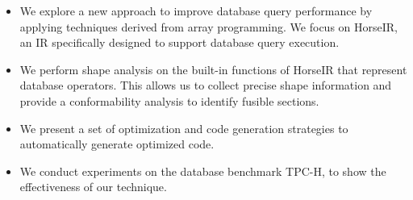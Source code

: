 \begin{itemize}
\item We explore a new approach to improve database query performance by
      applying techniques derived from array programming. We focus on HorseIR, an IR specifically designed to support database query execution.
\item We perform shape analysis on the built-in functions of HorseIR that represent database operators. This allows us to collect precise shape information and provide a conformability analysis to identify fusible sections. 
\item We present a set of optimization and code generation strategies to automatically
      generate optimized code.
\item We conduct experiments on the database benchmark TPC-H, to show the effectiveness of our technique.
\end{itemize}
